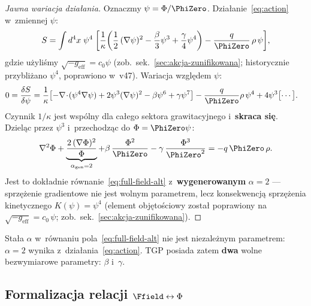 \begin{proof}[Jawna wariacja dzia\l{}ania]
Oznaczmy $\psi = \Phi/\PhiZero$. Dzia\l{}anie~\eqref{eq:action}
w~zmiennej $\psi$:
\[
  S = \int d^4x\;\psi^4\;\biggl[
    \frac{1}{\kappa}\biggl(
      \frac{1}{2}\,(\nabla\psi)^2
      - \frac{\beta}{3}\psi^3 + \frac{\gamma}{4}\psi^4
    \biggr)
    - \frac{q}{\PhiZero}\,\rho\,\psi
  \biggr],
\]
gdzie u\.zyli\'smy $\sqrt{-g_{\mathrm{eff}}} = c_0\psi$
(zob.\ sek.~\ref{sec:akcja-zunifikowana}; historycznie
przybli\.zano $\psi^4$, poprawiono w~v47).
Wariacja wzgl\k{e}dem $\psi$:
\begin{align}
  0 &= \frac{\delta S}{\delta\psi}
  = \frac{1}{\kappa}\bigl[
    -\nabla\!\cdot\!(\psi^4\nabla\psi)
    + 2\psi^3(\nabla\psi)^2
    - \beta\psi^6 + \gamma\psi^7
  \bigr]
  - \frac{q}{\PhiZero}\rho\,\psi^4
  + 4\psi^3\bigl[\cdots\bigr]. \nonumber
\end{align}
Czynnik $1/\kappa$ jest wsp\'olny dla ca\l{}ego sektora
grawitacyjnego i~\textbf{skraca si\k{e}}.
Dziel\k{a}c przez $\psi^3$ i~przechodz\k{a}c do $\Phi = \PhiZero\psi$:
\begin{equation}\label{eq:variation-explicit}
  \nabla^2\Phi
  + \underbrace{\frac{2\,(\nabla\Phi)^2}{\Phi}}_{\alpha_{\mathrm{gen}}=2}
  + \beta\,\frac{\Phi^2}{\PhiZero}
  - \gamma\,\frac{\Phi^3}{\PhiZero^2}
  = -q\,\PhiZero\,\rho.
\end{equation}
Jest to dok\l{}adnie r\'ownanie~\eqref{eq:full-field-alt}
z~\textbf{wygenerowanym} $\alpha = 2$ --- sprz\k{e}\.zenie
gradientowe nie jest wolnym parametrem, lecz konsekwencj\k{a}
sprz\k{e}\.zenia kinetycznego $K(\psi)=\psi^4$
(element obj\k{e}to\'sciowy zosta\l{} poprawiony na
$\sqrt{-g_{\mathrm{eff}}} = c_0\,\psi$;
zob.\ sek.~\ref{sec:akcja-zunifikowana}).
\end{proof}

\begin{corollary}\label{cor:alpha-fixed}
Sta\l{}a $\alpha$ w~r\'ownaniu pola~\eqref{eq:full-field-alt}
nie jest niezale\.znym parametrem: $\alpha = 2$ wynika
z~dzia\l{}ania~\eqref{eq:action}. TGP posiada zatem
\textbf{dwa} wolne bezwymiarowe parametry: $\beta$ i~$\gamma$.
\end{corollary}

\subsection{Formalizacja relacji $\Ffield \leftrightarrow \Phi$}\label{ssec:F-Phi}

